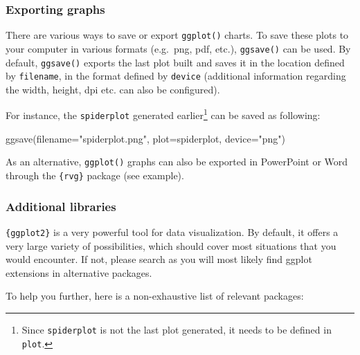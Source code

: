 \documentclass[
]{book}
\newenvironment{Shaded}{\begin{snugshade}}{\end{snugshade}}
\newcommand{\AttributeTok}[1]{\textcolor[rgb]{0.77,0.63,0.00}{#1}}
\newcommand{\FunctionTok}[1]{\textcolor[rgb]{0.00,0.00,0.00}{#1}}
\newcommand{\NormalTok}[1]{#1}
\newcommand{\StringTok}[1]{\textcolor[rgb]{0.31,0.60,0.02}{#1}}
\begin{document}
\hypertarget{exporting-graphs}{%
\subsubsection{Exporting graphs}\label{exporting-graphs}}

There are various ways to save or export \texttt{ggplot()} charts. To save these plots to your computer in various formats (e.g.~png, pdf, etc.), \texttt{ggsave()} can be used. By default, \texttt{ggsave()} exports the last plot built and saves it in the location defined by \texttt{filename}, in the format defined by \texttt{device} (additional information regarding the width, height, dpi etc. can also be configured).

For instance, the \texttt{spiderplot} generated earlier\footnote{Since \texttt{spiderplot} is not the last plot generated, it needs to be defined in \texttt{plot}.} can be saved as following:

\begin{Shaded}
\begin{Highlighting}[]
\FunctionTok{ggsave}\NormalTok{(}\AttributeTok{filename=}\StringTok{"spiderplot.png"}\NormalTok{, }\AttributeTok{plot=}\NormalTok{spiderplot, }\AttributeTok{device=}\StringTok{"png"}\NormalTok{)}
\end{Highlighting}
\end{Shaded}

As an alternative, \texttt{ggplot()} graphs can also be exported in PowerPoint or Word through the \texttt{\{rvg\}} package (see example).

\hypertarget{additional-libraries}{%
\subsubsection{Additional libraries}\label{additional-libraries}}

\texttt{\{ggplot2\}} is a very powerful tool for data visualization. By default, it offers a very large variety of possibilities, which should cover most situations that you would encounter. If not, please search as you will most likely find ggplot extensions in alternative packages.

To help you further, here is a non-exhaustive list of relevant packages:
\end{document}
